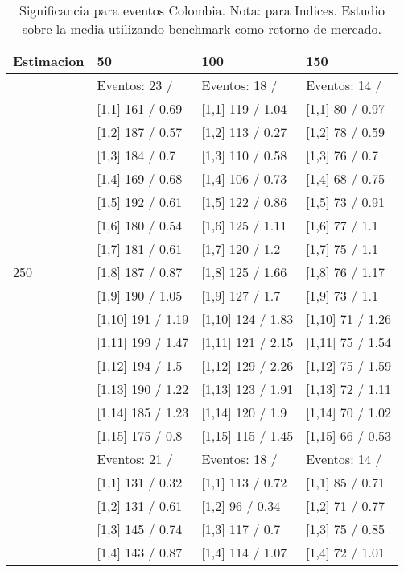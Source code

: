 \begin{table}

\caption{Significancia para eventos Colombia. Nota: para Indices. Estudio sobre la media utilizando benchmark como retorno de mercado.}
\centering
\begin{tabular}[t]{llll}
\toprule
Estimacion & 50 & 100 & 150\\
\midrule
 & Eventos:  23 / & Eventos:  18 / & Eventos:  14 /\\
 & {}[1,1] 161  / 0.69 & {}[1,1] 119  / 1.04 & {}[1,1] 80  / 0.97\\
 & {}[1,2] 187  / 0.57 & {}[1,2] 113  / 0.27 & {}[1,2] 78  / 0.59\\
 & {}[1,3] 184  / 0.7 & {}[1,3] 110  / 0.58 & {}[1,3] 76  / 0.7\\
 & {}[1,4] 169  / 0.68 & {}[1,4] 106  / 0.73 & {}[1,4] 68  / 0.75\\
\addlinespace
 & {}[1,5] 192  / 0.61 & {}[1,5] 122  / 0.86 & {}[1,5] 73  / 0.91\\
 & {}[1,6] 180  / 0.54 & {}[1,6] 125  / 1.11 & {}[1,6] 77  / 1.1\\
 & {}[1,7] 181  / 0.61 & {}[1,7] 120  / 1.2 & {}[1,7] 75  / 1.1\\
250 & {}[1,8] 187  / 0.87 & {}[1,8] 125  / 1.66 & {}[1,8] 76  / 1.17\\
 & {}[1,9] 190  / 1.05 & {}[1,9] 127  / 1.7 & {}[1,9] 73  / 1.1\\
\addlinespace
 & {}[1,10] 191  / 1.19 & {}[1,10] 124  / 1.83 & {}[1,10] 71  / 1.26\\
 & {}[1,11] 199  / 1.47 & {}[1,11] 121  / 2.15 & {}[1,11] 75  / 1.54\\
 & {}[1,12] 194  / 1.5 & {}[1,12] 129  / 2.26 & {}[1,12] 75  / 1.59\\
 & {}[1,13] 190  / 1.22 & {}[1,13] 123  / 1.91 & {}[1,13] 72  / 1.11\\
 & {}[1,14] 185  / 1.23 & {}[1,14] 120  / 1.9 & {}[1,14] 70  / 1.02\\
\addlinespace
 & {}[1,15] 175  / 0.8 & {}[1,15] 115  / 1.45 & {}[1,15] 66  / 0.53\\
 & Eventos:  21 / & Eventos:  18 / & Eventos:  14 /\\
 & {}[1,1] 131  / 0.32 & {}[1,1] 113  / 0.72 & {}[1,1] 85  / 0.71\\
 & {}[1,2] 131  / 0.61 & {}[1,2] 96  / 0.34 & {}[1,2] 71  / 0.77\\
 & {}[1,3] 145  / 0.74 & {}[1,3] 117  / 0.7 & {}[1,3] 75  / 0.85\\
\addlinespace
 & {}[1,4] 143  / 0.87 & {}[1,4] 114  / 1.07 & {}[1,4] 72  / 1.01\\

\end{tabular}
\end{table}
